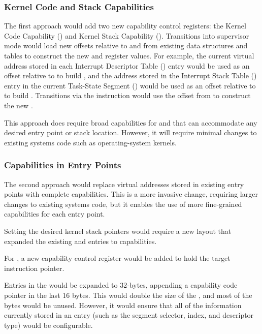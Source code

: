 \subsubsection{Kernel Code and Stack Capabilities}

The first approach would add two new capability control registers: the Kernel
Code Capability (\KCC{}) and Kernel Stack Capability (\KSC{}).  Transitions into
supervisor mode would load new offsets relative to \KCC{} and \KSC{} from
existing data structures and tables to construct the new \CIP{} and \CSP{}
register values.  For example, the current virtual address stored in
each Interrupt Descriptor Table (\IDT{}) entry would be used as an offset
relative to \KCC{} to build \CIP{}, and the address stored in the Interrupt
Stack Table (\IST{}) entry in the current Task-State Segment (\TSS{}) would
be used as an offset relative to \KSC{} to build \CSP{}.  Transitions via
the  instruction would use the offset from \LSTAR{} to
construct the new \CIP{}.

This approach does require broad capabilities
for \KCC{} and \KSC{} that can accommodate any desired entry point or stack
location.  However, it will require minimal changes to existing systems
code such as operating-system kernels.

\subsubsection{Capabilities in Entry Points}

The second approach would replace virtual addresses stored in
existing entry points with complete capabilities.  This is a more
invasive change, requiring larger changes to existing systems code, but
it enables the use of more fine-grained capabilities for each entry
point.

Setting the desired kernel stack pointers \CSP{} would require a new
\TSS{} layout that expanded the existing \RSP{} and \IST{} entries to
capabilities.

For , a new capability control register \CSTAR{} would be
added to hold the target instruction pointer.

Entries in the \IDT{} would be expanded to 32-bytes, appending a capability
code pointer in the last 16 bytes.  This would double the size of the
\IDT{}, and most of the bytes would be unused.  However, it would
ensure that all of the information currently stored in an \IDT{} entry
(such as the segment selector, \IST{} index, and descriptor type) would
be configurable.

